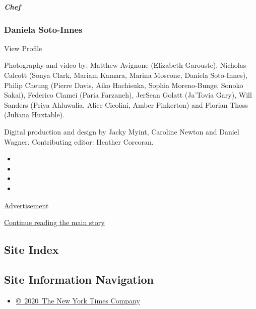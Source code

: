 \href{https://www.nytimes3xbfgragh.onion/2020/08/10/t-magazine/daniela-soto-innes-cooking-chef.html}{}

\hypertarget{chef}{%
\subparagraph{Chef}\label{chef}}

\hypertarget{daniela-soto-innes}{%
\subsubsection{Daniela Soto-Innes}\label{daniela-soto-innes}}

View Profile

Photography and video by: Matthew Avignone (Elizabeth Garouste),
Nicholas Calcott (Sonya Clark, Mariam Kamara, Marina Moscone, Daniela
Soto-Innes), Philip Cheung (Pierre Davis, Aiko Hachisuka, Sophia
Moreno-Bunge, Sonoko Sakai), Federico Ciamei (Paria Farzaneh), JerSean
Golatt (Ja'Tovia Gary), Will Sanders (Priya Ahluwalia, Alice Cicolini,
Amber Pinkerton) and Florian Thoss (Juliana Huxtable).

Digital production and design by Jacky Myint, Caroline Newton and Daniel
Wagner. Contributing editor: Heather Corcoran.

\begin{itemize}
\item
\item
\item
\item
\end{itemize}

Advertisement

\protect\hyperlink{after-bottom}{Continue reading the main story}

\hypertarget{site-index}{%
\subsection{Site Index}\label{site-index}}

\hypertarget{site-information-navigation}{%
\subsection{Site Information
Navigation}\label{site-information-navigation}}

\begin{itemize}
\tightlist
\item
  \href{https://help.nytimes3xbfgragh.onion/hc/en-us/articles/115014792127-Copyright-notice}{©~2020~The
  New York Times Company}
\end{itemize}


